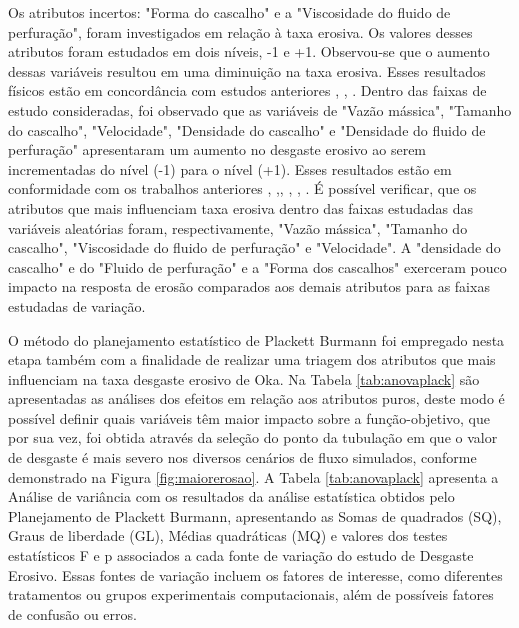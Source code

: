 Os atributos incertos: "Forma do cascalho" e a "Viscosidade do fluido de perfuração", foram investigados em relação à taxa erosiva. Os valores desses atributos foram estudados em dois níveis, -1 e +1. Observou-se que o aumento dessas variáveis resultou em uma diminuição na taxa erosiva. Esses resultados físicos estão em concordância com estudos anteriores \cite{yabuki}, \cite{walker}, \cite{hutchings}. Dentro das faixas de estudo consideradas, foi observado que as variáveis de "Vazão mássica", "Tamanho do cascalho", "Velocidade", "Densidade do cascalho" e "Densidade do fluido de perfuração" apresentaram um aumento no desgaste erosivo ao serem incrementadas do nível (-1) para o nível (+1). Esses resultados estão em conformidade com os trabalhos anteriores \cite{clark}, \cite{albu},\cite{kowsari}, \cite{kumar}, \cite{hutchings}, \cite{ANUR}. É possível verificar, que os atributos que mais influenciam taxa erosiva dentro das faixas estudadas das variáveis aleatórias foram, respectivamente, "Vazão mássica", "Tamanho do cascalho", "Viscosidade do fluido de perfuração" e "Velocidade". A "densidade do cascalho" e do "Fluido de perfuração" e a "Forma dos cascalhos" exerceram pouco impacto na resposta de erosão comparados aos demais atributos para as faixas estudadas de variação.

O método do planejamento estatístico de Plackett Burmann foi empregado nesta etapa também com a finalidade de realizar uma triagem dos atributos que mais influenciam na taxa desgaste erosivo de Oka. Na Tabela \ref{tab:anovaplack} são apresentadas as análises dos efeitos em relação aos atributos puros, deste modo é possível definir quais variáveis têm maior impacto sobre a função-objetivo, que por sua vez, foi obtida através da seleção do ponto da tubulação em que o valor de desgaste é mais severo nos diversos cenários de fluxo simulados, conforme demonstrado na Figura \ref{fig:maiorerosao}. A Tabela \ref{tab:anovaplack} apresenta a Análise de variância com os resultados da análise estatística obtidos pelo Planejamento de Plackett Burmann, apresentando as Somas de quadrados (SQ), Graus de liberdade (GL), Médias quadráticas (MQ) e valores dos testes estatísticos F e p associados a cada fonte de variação do estudo de Desgaste Erosivo. Essas fontes de variação incluem os fatores de interesse, como diferentes tratamentos ou grupos experimentais computacionais, além de possíveis fatores de confusão ou erros.


